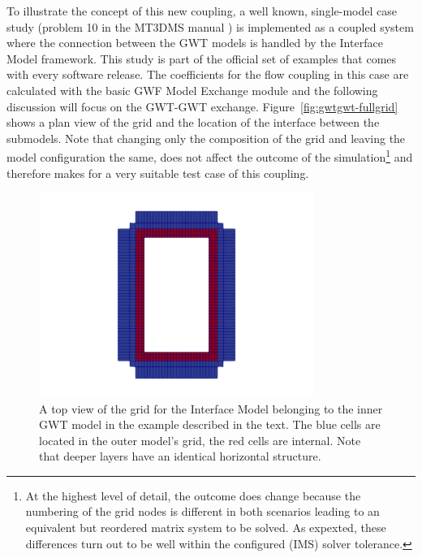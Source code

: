 To illustrate the concept of this new coupling, a well known, single-model case study (problem 10 in the MT3DMS manual \cite{zheng1999mt3dms}) is implemented as a coupled system where the connection between the GWT models is handled by the Interface Model framework. This study is part of the official set of examples that comes with every \mf software release. The coefficients for the flow coupling in this case are calculated with the basic GWF Model Exchange module and the following discussion will focus on the GWT-GWT exchange. Figure~\ref{fig:gwtgwt-fullgrid} shows a plan view of the grid and the location of the interface between the submodels. Note that changing only the composition of the grid and leaving the model configuration the same, does not affect the outcome of the simulation\footnote{At the highest level of detail, the outcome does change because the numbering of the grid nodes is different in both scenarios leading to an equivalent but reordered matrix system to be solved. As expexted, these differences turn out to be well within the configured (IMS) solver tolerance.} and therefore makes for a very suitable test case of this coupling.

\begin{figure}[!ht]
	\begin{center}
	\includegraphics[width=0.8\textwidth]{./Figures/InterfaceModel/gwt-ifmod-grid.png}
	\caption[A top view of the Interface Model grid]{A top view of the grid for the Interface Model belonging to the inner GWT model in the example described in the text. The blue cells are located in the outer model’s grid, the red cells are internal. Note that deeper layers have an identical horizontal structure.}
	\label{fig:gwtgwt-interface-grid}
	\end{center}
\end{figure}

